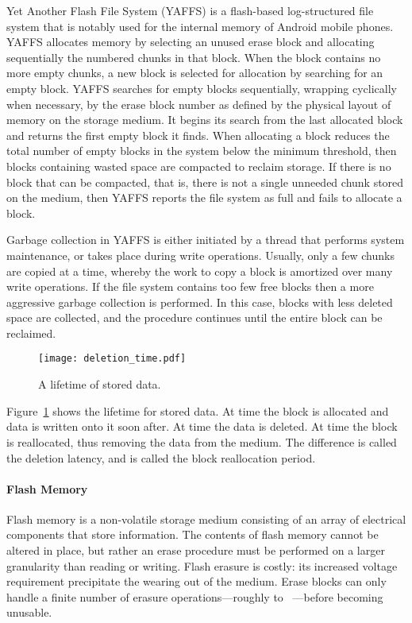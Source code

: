 \documentclass{acmtog}
\begin{document}
Yet Another Flash File System (YAFFS) is a flash-based log-structured file
system that is notably used for the internal memory  of Android mobile phones.
YAFFS allocates memory by selecting an unused erase block and allocating
sequentially the numbered chunks in that block. When the block contains no more empty
chunks, a new block is selected for allocation by searching for an empty
block. YAFFS  searches for empty blocks sequentially, wrapping cyclically when necessary, 
by the erase block number as defined by the
physical layout of memory on the storage medium. It begins its search from the
last allocated block and returns the first empty block it finds. When allocating
a block  reduces the total number of empty blocks in the system below the
minimum threshold, then blocks containing wasted space are
compacted to reclaim storage. If there is no block that can be
compacted, that is, there is not a single unneeded chunk stored on the medium, then
YAFFS reports the file system as full and fails to allocate a block.

Garbage collection in YAFFS is either initiated by a thread that
performs system maintenance, or takes place during write operations. Usually, only a few
chunks are copied at a time, whereby the work to copy a block is amortized over many
write operations. If the file system contains too few free blocks then a
more aggressive garbage collection is performed. In this case, blocks with
less deleted space are collected, and the procedure  continues until
the entire block can be reclaimed.

\begin{figure}[t]
\centering
\texttt{[image: deletion\_time.pdf]}
\caption{\small A lifetime of stored data. 
\label{f:deletion_time}\normalsize}
\end{figure}

Figure~\ref{f:deletion_time} shows the lifetime for stored data. At time 
the block is
allocated and data is written onto it soon after. At time  the data is
deleted. At time  the block is reallocated, thus removing the data from
the medium. The difference  is called the deletion latency, and  is called
the block reallocation period.


\paragraph{Flash Memory}
Flash memory is a non-volatile storage medium consisting of an array of
electrical components that store information. 
The contents of flash memory cannot be
altered in place, but rather an erase procedure must be performed on a
larger granularity than reading or writing.
Flash erasure is costly: its increased
voltage requirement precipitate the wearing out of the medium.
Erase blocks can only handle a finite
number of erasure operations---roughly  to ~\cite{flashlife}---before
becoming unusable. 
\end{document}
